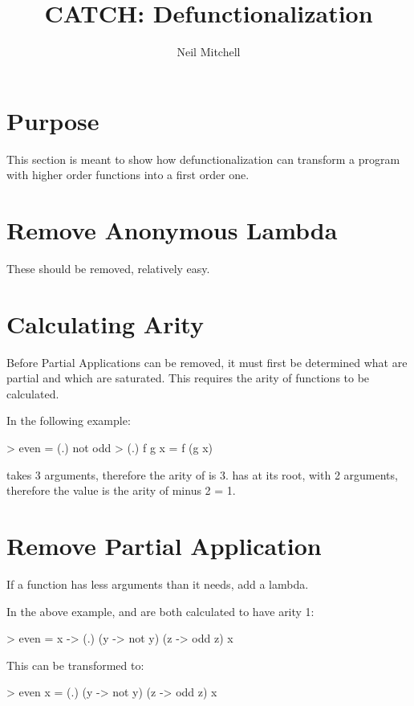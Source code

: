 \documentclass{article}
\title{CATCH: Defunctionalization}
\author{Neil Mitchell}
\begin{document}
\maketitle

\section{Purpose}

This section is meant to show how defunctionalization can transform a program
with higher order functions into a first order one.

\section{Remove Anonymous Lambda}

These should be removed, relatively easy.

\section{Calculating Arity}

Before Partial Applications can be removed, it must first be determined what
are partial and which are saturated. This requires the arity of functions to be
calculated.

In the following example:

\begin{code}
> even = (.) not odd
> (.) f g x = f (g x)
\end{code}

 takes 3 arguments, therefore the arity of  is 3.  has
 at its root, with 2 arguments, therefore the value is the arity of
 minus 2 = 1.

\section{Remove Partial Application}

If a function has less arguments than it needs, add a lambda.

In the above example,  and  are both calculated to have arity 1:

\begin{code}
> even = \lam{}x -> (.) (\lam{}y -> not y) (\lam{}z -> odd z) x
\end{code}

This can be transformed to:

\begin{code}
> even x = (.) (\lam{}y -> not y) (\lam{}z -> odd z) x
\end{code}
\end{document}

